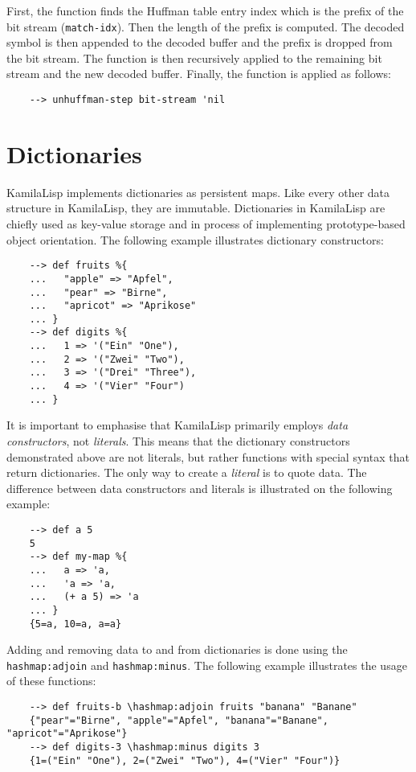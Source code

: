 First, the function finds the Huffman table entry index which is the prefix of the bit stream (\verb|match-idx|). Then the length of the prefix is computed. The decoded symbol is then appended to the decoded buffer and the prefix is dropped from the bit stream. The function is then recursively applied to the remaining bit stream and the new decoded buffer. Finally, the function is applied as follows:

\begin{Verbatim}
    --> unhuffman-step bit-stream 'nil
\end{Verbatim}

\section{Dictionaries}

KamilaLisp implements dictionaries as persistent maps. Like every other data structure in KamilaLisp, they are immutable. Dictionaries in KamilaLisp are chiefly used as key-value storage and in process of implementing prototype-based object orientation. The following example illustrates dictionary constructors:
\begin{Verbatim}
    --> def fruits %{
    ...   "apple" => "Apfel",
    ...   "pear" => "Birne",
    ...   "apricot" => "Aprikose"
    ... }
    --> def digits %{
    ...   1 => '("Ein" "One"),
    ...   2 => '("Zwei" "Two"),
    ...   3 => '("Drei" "Three"),
    ...   4 => '("Vier" "Four")
    ... }
\end{Verbatim}

It is important to emphasise that KamilaLisp primarily employs \textit{data constructors}, not \textit{literals}. This means that the dictionary constructors demonstrated above are not literals, but rather functions with special syntax that return dictionaries. The only way to create a \textit{literal} is to quote data. The difference between data constructors and literals is illustrated on the following example:

\begin{Verbatim}
    --> def a 5
    5
    --> def my-map %{
    ...   a => 'a,
    ...   'a => 'a,
    ...   (+ a 5) => 'a
    ... }
    {5=a, 10=a, a=a}
\end{Verbatim}

Adding and removing data to and from dictionaries is done using the \verb|hashmap:adjoin| and \verb|hashmap:minus|. The following example illustrates the usage of these functions:

\begin{Verbatim}
    --> def fruits-b \hashmap:adjoin fruits "banana" "Banane"
    {"pear"="Birne", "apple"="Apfel", "banana"="Banane", "apricot"="Aprikose"}
    --> def digits-3 \hashmap:minus digits 3
    {1=("Ein" "One"), 2=("Zwei" "Two"), 4=("Vier" "Four")}
\end{Verbatim}

